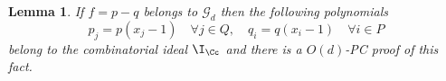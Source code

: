 \documentclass[11pt]{article}
\newtheorem{lemma}[theorem]{Lemma}
\begin{document}
\begin{lemma}\label{th:MiNVA_sos}
If $f=p-q$ belongs to $\mathcal{G}_d$ then the following polynomials 
%
\begin{equation}\label{MINVA1}
    {p_j = p(x_j-1) \quad \forall j \in Q, \quad q_i = q(x_i-1) \quad \forall i \in P}
\end{equation}
%
belong to the combinatorial ideal $\I_\Cc$ and there is a $O(d)$-PC proof of this fact.
\end{lemma}
\end{document}
